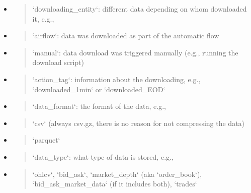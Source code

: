 \documentclass[11pt, reqno]{amsart}
\begin{document}
\begin{itemize}
\item
  \begin{quote}
  `downloading\_entity`: different data depending on whom downloaded it,
  e.g.,
  \end{quote}
\end{itemize}

\begin{itemize}
\item
  \begin{quote}
  `airflow`: data was downloaded as part of the automatic flow
  \end{quote}
\item
  \begin{quote}
  `manual`: data download was triggered manually (e.g., running the
  download script)
  \end{quote}
\end{itemize}

\begin{itemize}
\item
  \begin{quote}
  `action\_tag`: information about the downloading, e.g.,
  `downloaded\_1min` or `downloaded\_EOD`
  \end{quote}
\item
  \begin{quote}
  `data\_format`: the format of the data, e.g.,
  \end{quote}
\end{itemize}

\begin{itemize}
\item
  \begin{quote}
  `csv` (always csv.gz, there is no reason for not compressing the data)
  \end{quote}
\item
  \begin{quote}
  `parquet`
  \end{quote}
\end{itemize}

\begin{itemize}
\item
  \begin{quote}
  `data\_type`: what type of data is stored, e.g.,
  \end{quote}
\end{itemize}

\begin{itemize}
\item
  \begin{quote}
  `ohlcv`, `bid\_ask`, `market\_depth` (aka `order\_book`),
  `bid\_ask\_market\_data` (if it includes both), `trades`
  \end{quote}
\end{itemize}
\end{document}
